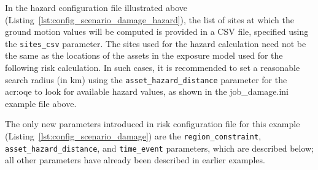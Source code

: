 In the hazard configuration file illustrated above
(Listing~\ref{lst:config_scenario_damage_hazard}), the list of sites at which
the ground motion values will be computed is provided in a CSV file, specified
using the \Verb+sites_csv+ parameter. The sites used for the hazard
calculation need not be the same as the locations of the assets in the
exposure model used for the following risk calculation. In such cases, it is
recommended to set a reasonable search radius (in km) using the
\Verb+asset_hazard_distance+ parameter for the \glsdesc{acr:oqe} to look for
available hazard values, as shown in the job\_damage.ini example file above.

The only new parameters introduced in risk configuration file for this example
(Listing~\ref{lst:config_scenario_damage}) are the \Verb+region_constraint+,
\Verb+asset_hazard_distance+, and \Verb+time_event+ parameters, which are
described below; all other parameters have already been described in earlier
examples.


